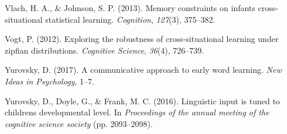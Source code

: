 \documentclass[10pt, letterpaper]{article}
\begin{document}
\hypertarget{ref-vlach2013}{}
Vlach, H. A., \& Johnson, S. P. (2013). Memory constraints on infants
cross-situational statistical learning. \emph{Cognition}, \emph{127}(3),
375--382.

\hypertarget{ref-vogt2012}{}
Vogt, P. (2012). Exploring the robustness of cross-situational learning
under zipfian distributions. \emph{Cognitive Science}, \emph{36}(4),
726--739.

\hypertarget{ref-yurovsky2017}{}
Yurovsky, D. (2017). A communicative approach to early word learning.
\emph{New Ideas in Psychology}, 1--7.

\hypertarget{ref-yurovsky2016}{}
Yurovsky, D., Doyle, G., \& Frank, M. C. (2016). Linguistic input is
tuned to childrens developmental level. In \emph{Proceedings of the
annual meeting of the cognitive science society} (pp. 2093--2098).


\end{document}
